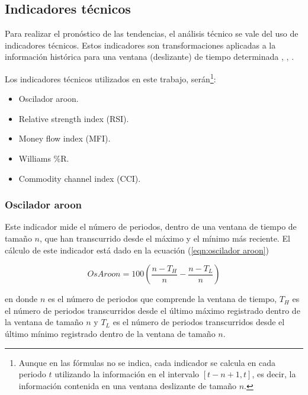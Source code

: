 \documentclass[12pt]{scrbook}
\theoremstyle{break}
\theoremstyle{break}
\begin{document}
\subsection{Indicadores técnicos}
\label{subseccion:indicadores tecnicos}
Para realizar el pronóstico de las tendencias, el análisis técnico se vale del uso de indicadores técnicos. Estos indicadores son transformaciones aplicadas a la información histórica para una ventana (deslizante) de tiempo determinada \cite{murphy1999technical}, \cite{technicalAnalysisKirkPatrick}, \cite{encycoplediaTechnicalIndicators}.

Los indicadores técnicos utilizados en este trabajo, serán\footnote{Aunque en las fórmulas no se indica, cada indicador se calcula en cada periodo $t$ utilizando la información en el intervalo $\left[t-n + 1, t\right]$, es decir, la información contenida en una ventana deslizante de tamaño $n$. }:

\begin{itemize}
\item Oscilador aroon.

\item Relative strength index (RSI).

\item Money flow index (MFI).

\item Williams \%R.

\item Commodity channel index (CCI).
\end{itemize}


\subsubsection{Oscilador aroon}
\label{subsubseccion:Oscilador Aroon}
Este indicador mide el número de periodos, dentro de una ventana de tiempo de tamaño $n$, que han transcurrido desde el máximo y el mínimo más reciente. El cálculo de este indicador está dado en la ecuación (\ref{eqn:oscilador aroon})

\begin{equation} \label{eqn:oscilador aroon}
OsAroon = 100 \left( \dfrac{  n - T_H  } { n } - \dfrac{  n - T_L  } { n } \right)
\end{equation}

en donde $n$ es el número de periodos que comprende la ventana de tiempo, $T_H$ es el número de periodos transcurridos desde el último máximo registrado dentro de la ventana de tamaño $n$ y $T_L$ es el número de periodos transcurridos desde el último mínimo registrado dentro de la ventana de tamaño $n$.
\end{document}
